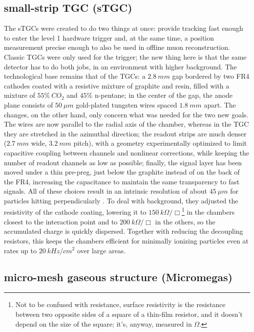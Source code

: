 \documentclass[11pt,a4paper,twoside,openright]{report}
\begin{document}
\subsection{small-strip TGC (sTGC)}
The sTGCs \cite{ATLASdesc, NSW} were created to do two things at once: provide tracking fast enough to enter the level 1 hardware trigger and, at the same time, a position measurement precise enough to also be used in offline muon reconstruction. Classic TGCs were only used for the trigger; the new thing here is that the same detector has to do both jobs, in an environment with higher background. The technological base remains that of the TGCs: a \(2.8\ mm\) gap bordered by two FR4 cathodes coated with a resistive mixture of graphite and resin, filled with a mixture of \(55\%\ CO_2\) and \(45\%\) n-pentane; in the center of the gap, the anode plane consists of \(50\ \mu m\) gold-plated tungsten wires spaced \(1.8\ mm\) apart. The changes, on the other hand, only concern what was needed for the two new goals. The wires are now parallel to the radial axis of the chamber, whereas in the TGC they are stretched in the azimuthal direction; the readout strips are much denser (\(2.7\ mm\) wide, \(3.2\ mm\) pitch), with a geometry experimentally optimized to limit capacitive coupling between channels and nonlinear corrections, while keeping the number of readout channels as low as possible; finally, the signal layer has been moved under a thin pre-preg, just below the graphite instead of on the back of the FR4, increasing the capacitance to maintain the same transparency to fast signals. All of these choices result in an intrinsic resolution of about \(45\ \mu m\) for particles hitting perpendicularly \cite{NSW2}. To deal with background, they adjusted the resistivity of the cathode coating, lowering it to \(150\ k\Omega/\Box\)\footnote{Not to be confused with resistance, surface resistivity is the resistance between two opposite sides of a square of a thin-film resistor, and it doesn't depend on the size of the square; it's, anyway, measured in \(\Omega\).} in the chambers closest to the interaction point and to \(200\ k\Omega/\Box\) in the others, so the accumulated charge is quickly dispersed. Together with reducing the decoupling resistors, this keeps the chambers efficient for minimally ionizing particles even at rates up to \(20\ kHz/cm^2\) over large areas.

\subsection{micro-mesh gaseous structure (Micromegas)}
\end{document}
